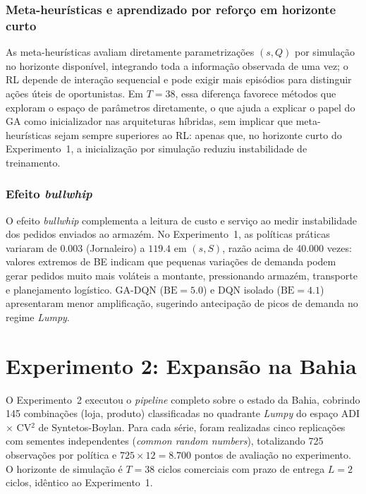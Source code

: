 \subsubsection*{Meta-heurísticas e aprendizado por reforço em horizonte curto}

As meta-heurísticas avaliam diretamente parametrizações $(s,Q)$ por simulação no horizonte disponível, integrando toda a informação observada de uma vez; o RL depende de interação sequencial e pode exigir mais episódios para distinguir ações úteis de oportunistas. Em $T=38$, essa diferença favorece métodos que exploram o espaço de parâmetros diretamente, o que ajuda a explicar o papel do GA como inicializador nas arquiteturas híbridas, sem implicar que meta-heurísticas sejam sempre superiores ao RL: apenas que, no horizonte curto do Experimento~1, a inicialização por simulação reduziu instabilidade de treinamento.

\subsubsection*{Efeito \textit{bullwhip}}

O efeito \textit{bullwhip} complementa a leitura de custo e serviço ao medir instabilidade dos pedidos enviados ao armazém. No Experimento~1, as políticas práticas variaram de $0.003$ (Jornaleiro) a $119.4$ em $(s,S)$, razão acima de 40.000 vezes: valores extremos de BE indicam que pequenas variações de demanda podem gerar pedidos muito mais voláteis a montante, pressionando armazém, transporte e planejamento logístico. GA-DQN ($\text{BE}=5.0$) e DQN isolado ($\text{BE}=4.1$) apresentaram menor amplificação, sugerindo antecipação de picos de demanda no regime \textit{Lumpy}.

\section{Experimento 2: Expansão na Bahia}

O Experimento~2 executou o \textit{pipeline} completo sobre o estado da Bahia, cobrindo 145 combinações (loja, produto) classificadas no quadrante \textit{Lumpy} do espaço ADI $\times$ CV$^2$ de Syntetos-Boylan. Para cada série, foram realizadas cinco replicações com sementes independentes (\textit{common random numbers}), totalizando 725 observações por política e $725 \times 12 = 8.700$ pontos de avaliação no experimento. O horizonte de simulação é $T=38$ ciclos comerciais com prazo de entrega $L=2$ ciclos, idêntico ao Experimento~1.

